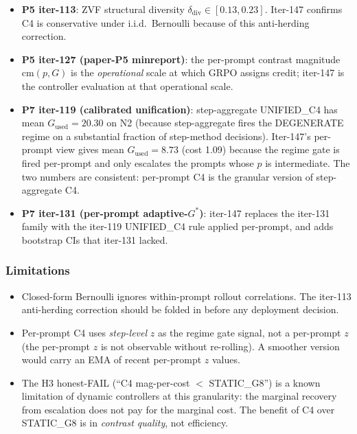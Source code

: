 \begin{itemize}
\item \textbf{P5 iter-113}: ZVF structural diversity $\delta_{\mathrm{div}} \in [0.13, 0.23]$.
      Iter-147 confirms C4 is conservative under i.i.d.\ Bernoulli because of
      this anti-herding correction.
\item \textbf{P5 iter-127 (paper-P5 minreport)}: the per-prompt contrast magnitude
      $\mathrm{cm}(p, G)$ is the \emph{operational} scale at which GRPO assigns
      credit; iter-147 is the controller evaluation at that operational scale.
\item \textbf{P7 iter-119 (calibrated unification)}: step-aggregate UNIFIED\_C4
      has mean $G_{\mathrm{used}}=20.30$ on N2 (because step-aggregate fires
      the DEGENERATE regime on a substantial fraction of step-method decisions).
      Iter-147's per-prompt view gives mean $G_{\mathrm{used}}=8.73$ (cost 1.09)
      because the regime gate is fired per-prompt and only escalates the prompts
      whose $\hat p$ is intermediate. The two numbers are consistent: per-prompt
      C4 is the granular version of step-aggregate C4.
\item \textbf{P7 iter-131 (per-prompt adaptive-$G^*$)}: iter-147 replaces the
      iter-131 family with the iter-119 UNIFIED\_C4 rule applied per-prompt,
      and adds bootstrap CIs that iter-131 lacked.
\end{itemize}

\subsubsection*{Limitations}

\begin{itemize}
\item Closed-form Bernoulli ignores within-prompt rollout correlations. The
      iter-113 anti-herding correction should be folded in before any
      deployment decision.
\item Per-prompt C4 uses \emph{step-level} $z$ as the regime gate signal,
      not a per-prompt $z$ (the per-prompt $z$ is not observable without
      re-rolling). A smoother version would carry an EMA of recent
      per-prompt $z$ values.
\item The H3 honest-FAIL (``C4 mag-per-cost $<$ STATIC\_G8'') is a known
      limitation of dynamic controllers at this granularity: the marginal
      recovery from escalation does not pay for the marginal cost. The
      benefit of C4 over STATIC\_G8 is in \emph{contrast quality}, not
      efficiency.
\end{itemize}


